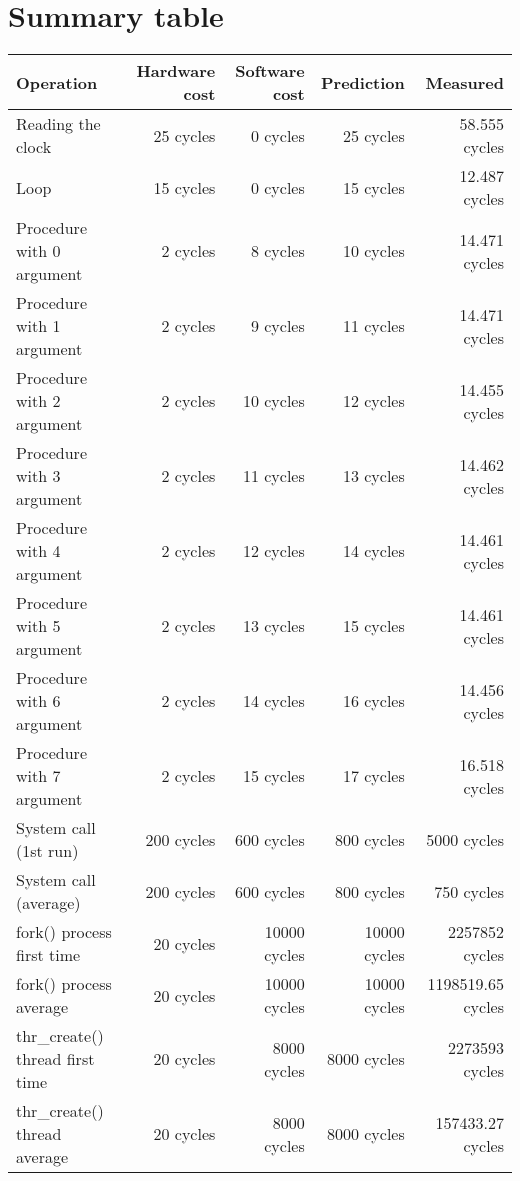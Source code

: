 \section{Summary table}


\begin{table}[h]
\begin{center}
\begin{tabular}{| l | r | r | r | r |} \hline
Operation 			& Hardware cost 	& Software cost 	& Prediction	& Measured \\ \hline
Reading the clock 	& 25 cycles		& 0 cycles			& 25 cycles 	& 58.555 cycles \\ \hline
Loop 				& 15 cycles 		& 0 cycles 		& 15 cycles 	& 12.487 cycles \\ \hline \hline

Procedure with 0 argument & 2 cycles 	& 8 cycles  		& 10 cycles 	& 14.471 cycles \\ \hline
Procedure with 1 argument  & 2 cycles 	& 9 cycles  		& 11 cycles 	& 14.471 cycles \\ \hline
Procedure with 2 argument  & 2 cycles 	& 10 cycles  		& 12 cycles 	& 14.455 cycles \\ \hline
Procedure with 3 argument  & 2 cycles 	& 11 cycles 		& 13 cycles 	& 14.462 cycles \\ \hline
Procedure with 4 argument  & 2 cycles 	& 12 cycles 		& 14 cycles 	& 14.461 cycles \\ \hline
Procedure with 5 argument  & 2 cycles 	& 13 cycles 		& 15 cycles 	& 14.461 cycles \\ \hline
Procedure with 6 argument  & 2 cycles 	& 14 cycles 		& 16 cycles 	& 14.456 cycles \\ \hline
Procedure with 7 argument  & 2 cycles 	& 15 cycles 		& 17 cycles 	& 16.518 cycles \\ \hline\hline

System call (1st run) & 200 cycles & 600 cycles & 800 cycles & 5000 cycles\\
\hline
System call (average) & 200 cycles & 600 cycles & 800 cycles & 750 cycles\\
\hline\hline

fork() process first time		& 20 cycles & 10000 cycles 	& 10000 cycles& 2257852 cycles \\ \hline
fork() process average		& 20 cycles & 10000 cycles 	& 10000 cycles& 1198519.65 cycles \\ \hline
thr\_create() thread first time	& 20 cycles & 8000 cycles		& 8000 cycles &  2273593 cycles \\ \hline
thr\_create() thread 	average	& 20 cycles & 8000 cycles		& 8000 cycles &  157433.27 cycles \\ \hline\hline



\end{tabular}
\end{center}
\end{table}
